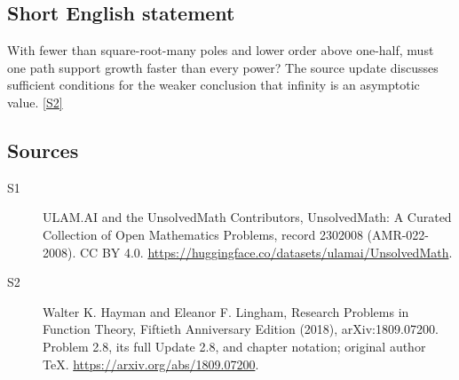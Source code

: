 \documentclass[11pt]{article}
\newcommand{\sref}[2]{\hyperlink{source:#1:#2}{[S#2]}}
\begin{document}
\subsection{Short English statement}
With fewer than square-root-many poles and lower order above one-half, must one path support growth faster than every power? The source update discusses sufficient conditions for the weaker conclusion that infinity is an asymptotic value. \sref{2302008}{2}
\subsection{Sources}
\begin{description}
\item[\hypertarget{source:2302008:1}{S1}] ULAM.AI and the UnsolvedMath Contributors, UnsolvedMath: A Curated Collection of Open Mathematics Problems, record 2302008 (AMR-022-2008). CC BY 4.0. \url{https://huggingface.co/datasets/ulamai/UnsolvedMath}.
\item[\hypertarget{source:2302008:2}{S2}] Walter K. Hayman and Eleanor F. Lingham, Research Problems in Function Theory, Fiftieth Anniversary Edition (2018), arXiv:1809.07200. Problem 2.8, its full Update 2.8, and chapter notation; original author TeX. \url{https://arxiv.org/abs/1809.07200}.
\end{description}
\label{end:2302008}
\end{document}
